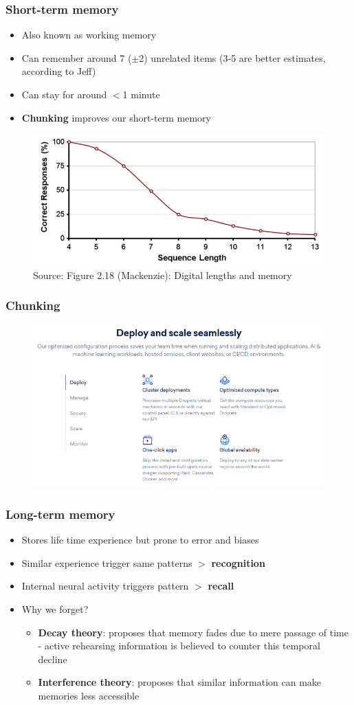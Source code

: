 \documentclass{beamer}
\begin{document}
\begin{frame}
	\frametitle{Short-term memory}
	\begin{itemize}
		\item Also known as working memory
		\item Can remember around 7 ($\pm$2) unrelated items (3-5 are better estimates, according to Jeff)
		\item Can stay for around $<$1 minute
		\item \textbf{Chunking} improves our short-term memory
	\end{itemize}
	\begin{figure}
		\includegraphics[width=0.6\linewidth]{image/2-18}
		\caption{Source: Figure 2.18 (Mackenzie): Digital lengths and memory}
	\end{figure}
\end{frame}

\begin{frame}
	\frametitle{Chunking}
	\begin{figure}
		\includegraphics[width=0.8\linewidth]{image/chunking}
	\end{figure}
\end{frame}

\begin{frame}
	\frametitle{Long-term memory}
	\begin{itemize}
		\item Stores life time experience but prone to error and biases
		\item Similar experience trigger same patterns $>$ \textbf{recognition}
		\item Internal neural activity triggers pattern $>$ \textbf{recall}
		\item Why we forget?
		\begin{itemize}
			\item \textbf{Decay theory}: proposes that memory fades due to mere passage of time - active rehearsing information is believed to counter this temporal decline
			\item \textbf{Interference theory}: proposes that similar information can make memories less accessible
		\end{itemize}
	\end{itemize}
\end{frame}
\end{document}
